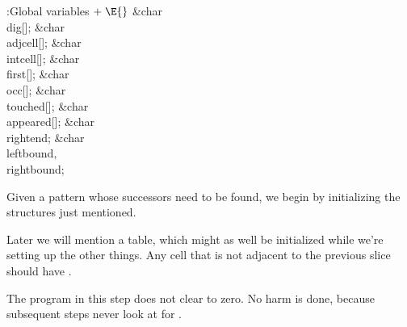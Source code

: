 \Y\B\4:Global variables\X${}\mathrel+\E{}$\6
\&{char} \\{dig}[];\6
\&{char} \\{adjcell}[];\6
\&{char} \\{intcell}[];\6
\&{char} \\{first}[];\6
\&{char} \\{occ}[];\6
\&{char} \\{touched}[];\6
\&{char} \\{appeared}[];\6
\&{char} \\{rightend};\6
\&{char} \\{leftbound}${},{}$ \\{rightbound};\par
\fi

Given a pattern  whose successors need to be
found,
we begin by initializing the structures just mentioned.

Later we will mention a  table, which might as well be
initialized while we're setting up the other things.
Any cell that is not adjacent to the
previous slice should have .

The program in this step does not clear  to zero.
No harm is done, because subsequent steps never look at  for
.

